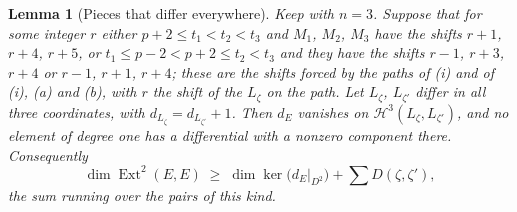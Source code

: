 \documentclass[11pt,reqno]{amsart}
\theoremstyle{plain}
\newtheorem{lemma}[theorem]{Lemma}
\theoremstyle{definition}
\theoremstyle{remark}
\newcommand{\cH}{\mathcal{H}}
\DeclareMathOperator{\Ext}{Ext}
\begin{document}
\begin{lemma}[Pieces that differ everywhere]\label{lem:allthree}
Keep  with $n=3$. Suppose that for some integer $r$
either $p+2\le t_{1}<t_{2}<t_{3}$ and $M_{1}$, $M_{2}$, $M_{3}$ have the
shifts $r+1$, $r+4$, $r+5$, or $t_{1}\le p-2<p+2\le t_{2}<t_{3}$ and they
have the shifts $r-1$, $r+3$, $r+4$ or $r-1$, $r+1$, $r+4$; these are the
shifts forced by the paths of (i) and of
(i), (a) and (b), with $r$ the shift of the
$L_{\zeta}$ on the path. Let $L_{\zeta}$, $L_{\zeta'}$ differ in all three
coordinates, with $d_{L_{\zeta}}=d_{L_{\zeta'}}+1$. Then $d_{E}$ vanishes on
$\cH^{3}(L_{\zeta},L_{\zeta'})$, and no element of degree one has a
differential with a nonzero component there. Consequently
\[
  \dim\Ext^{2}(E,E)\;\ge\;\dim\ker\bigl(d_{E}|_{D^{2}}\bigr)
  +\sum D(\zeta,\zeta'),
\]
the sum running over the pairs of this kind.
\end{lemma}
\end{document}
